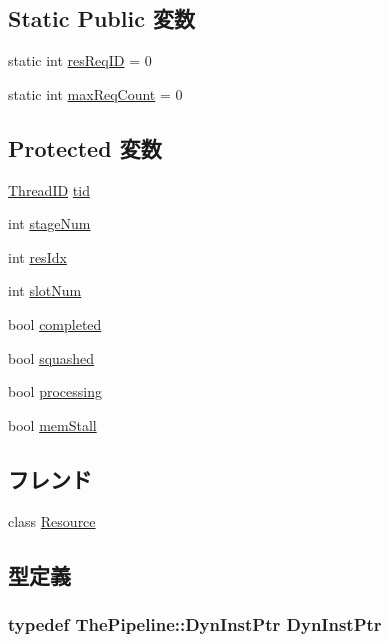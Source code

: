 \subsection*{Static Public 変数}
\begin{DoxyCompactItemize}
\item 
static int \hyperlink{classResourceRequest_ab75c4ad64b5a31674a1550f2decad01e}{resReqID} = 0
\item 
static int \hyperlink{classResourceRequest_a705be8b2db020ec7796ef141692c7bdc}{maxReqCount} = 0
\end{DoxyCompactItemize}
\subsection*{Protected 変数}
\begin{DoxyCompactItemize}
\item 
\hyperlink{base_2types_8hh_ab39b1a4f9dad884694c7a74ed69e6a6b}{ThreadID} \hyperlink{classResourceRequest_aa508770268ee4ceaf16054b9e0be0e17}{tid}
\item 
int \hyperlink{classResourceRequest_a9da7aa2f94c428eaed5adad96a6ab151}{stageNum}
\item 
int \hyperlink{classResourceRequest_a686341f35cd618a92b668dbd8e3014b3}{resIdx}
\item 
int \hyperlink{classResourceRequest_ac17d70d00e569f6deb2dab6f12d8f08f}{slotNum}
\item 
bool \hyperlink{classResourceRequest_a8c06e370b709d689e392a4b7b53b47c5}{completed}
\item 
bool \hyperlink{classResourceRequest_ab80f932400baee226095b8eb35f92383}{squashed}
\item 
bool \hyperlink{classResourceRequest_aa29ba1ab10437ca37a642ef9235884b3}{processing}
\item 
bool \hyperlink{classResourceRequest_ac7d24dd5b4734e4076372439a9991b36}{memStall}
\end{DoxyCompactItemize}
\subsection*{フレンド}
\begin{DoxyCompactItemize}
\item 
class \hyperlink{classResourceRequest_a0ebbdc315d2466b93b663656f9d9ab44}{Resource}
\end{DoxyCompactItemize}


\subsection{型定義}
\hypertarget{classResourceRequest_af9d0c8a46736ba6aa2d8bb94da1a5e73}{
\subsubsection[{DynInstPtr}]{\setlength{\rightskip}{0pt plus 5cm}typedef {\bf ThePipeline::DynInstPtr} {\bf DynInstPtr}}}
\label{classResourceRequest_af9d0c8a46736ba6aa2d8bb94da1a5e73}


